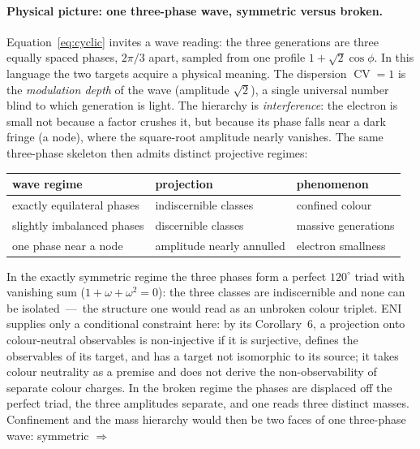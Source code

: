 \documentclass[11pt]{article}
\theoremstyle{definition}
\theoremstyle{remark}
\newcommand{\CV}{\operatorname{CV}}
\begin{document}
    \paragraph{Physical picture: one three-phase wave, symmetric versus broken.}
      Equation~\eqref{eq:cyclic} invites a wave reading: the three generations are three equally spaced phases,
      $2\pi/3$ apart, sampled from one profile $1 + \sqrt2 \cos\phi$.
      In this language the two targets acquire a physical meaning.
      The dispersion $\CV = 1$ is the \emph{modulation depth} of the wave (amplitude $\sqrt2$), a single universal
      number blind to which generation is light.
      The hierarchy is \emph{interference}: the electron is small not because a factor crushes it, but because its
      phase falls near a dark fringe (a node), where the square-root amplitude nearly vanishes.
      The same three-phase skeleton then admits distinct projective regimes:
      \begin{center}
        \begin{tabular}{lll}
          \hline
          wave regime & projection & phenomenon \\
          \hline
          exactly equilateral phases & indiscernible classes & confined colour \\
          slightly imbalanced phases & discernible classes & massive generations \\
          one phase near a node & amplitude nearly annulled & electron smallness \\
          \hline
        \end{tabular}
      \end{center}
      In the exactly symmetric regime the three phases form a perfect $120^\circ$ triad with vanishing sum
      ($1 + \omega + \omega^2 = 0$): the three classes are indiscernible and none can be isolated~---~the structure
      one would read as an unbroken colour triplet.
      ENI~\cite{Beau2026l} supplies only a conditional constraint here: by its Corollary~6, a projection onto
      colour-neutral observables is non-injective if it is surjective, defines the observables of its target,
      and has a target not isomorphic to its source; it takes colour neutrality as a premise and does not derive
      the non-observability of separate colour charges.
      In the broken regime the phases are displaced off the perfect triad, the three amplitudes separate, and one
      reads three distinct masses.
      Confinement and the mass hierarchy would then be two faces of one three-phase wave: symmetric $\Rightarrow$
\end{document}
